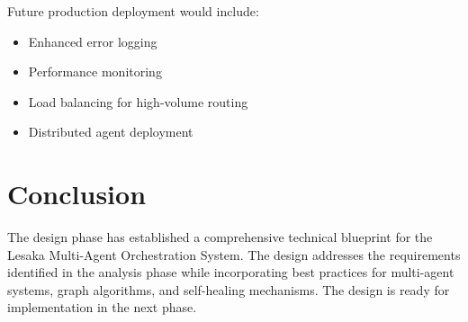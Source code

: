 Future production deployment would include:

\begin{itemize}
    \item Enhanced error logging
    \item Performance monitoring
    \item Load balancing for high-volume routing
    \item Distributed agent deployment
\end{itemize}

\section{Conclusion}

The design phase has established a comprehensive technical blueprint for the Lesaka Multi-Agent Orchestration System. The design addresses the requirements identified in the analysis phase while incorporating best practices for multi-agent systems, graph algorithms, and self-healing mechanisms. The design is ready for implementation in the next phase.
